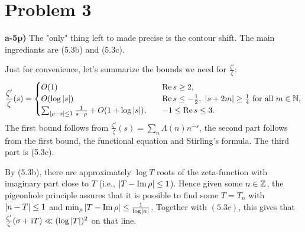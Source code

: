 \documentclass[a4paper,11pt]{article}
\begin{document}
\section*{Problem 3}
\textbf{a-5p)}
    The "only" thing left to made precise is the contour shift. The main ingrediants
    are (5.3b) and (5.3c).

    Just for convenience, let's summarize the bounds we need for
    $\tfrac{\zeta'}\zeta$:
    \[
        \frac{\zeta'}{\zeta}(s) = 
        \begin{cases}
            O(1) \quad &\operatorname{Re} s \geq 2, \\
            O(\log \left\lvert s \right\rvert) \quad &\operatorname{Re} s \leq -\frac 12, \ \left\lvert s+2m \right\rvert \geq \frac 14 \text{ for all $m \in \mathbb{N}$,} \\
            \sum_{\left\lvert \rho - s \right\rvert \leq 1} \frac{1}{s-\rho} + O(1 + \log \left\lvert s \right\rvert),
            \quad & -1 \leq \operatorname{Re} s \leq 3. 
        \end{cases}
    \]
    The first bound follows from $\frac{\zeta'}\zeta(s) = \sum_n \Lambda(n) n^{-s}$,
    the second part follows from the first bound, the functional equation and
    Stirling's formula. The third part is (5.3c).

    By (5.3b), there are approximately $\log T$ roots of the zeta-function
    with imaginary part close to $T$ (i.e., $\left\lvert T- \operatorname{Im} \rho \right\rvert \leq 1$).
    Hence given some $n \in \mathbb{Z}$, the pigeonhole principle assures that it is 
    possible to find some $T = T_n$ with $\left\lvert n-T \right\rvert \leq 1$ and 
    $\min_{\rho}{\left\lvert T - \operatorname{Im}\rho \right\rvert} \leq \frac 1{\log \left\lvert n \right\rvert}$. Together
    with $(5.3c)$, this gives that $\frac{\zeta'}{\zeta}(\sigma + \mathrm i
    T) \ll (\log \left\lvert T \right\rvert)^2$ on that line. 
\end{document}
